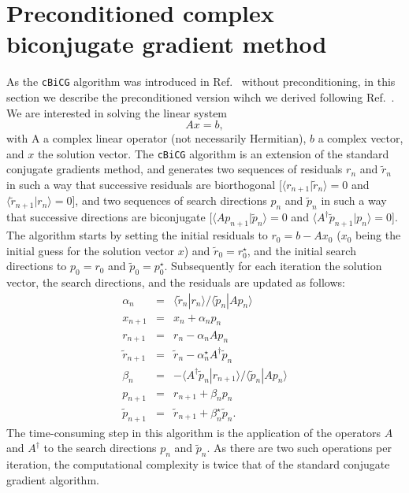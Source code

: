 \documentclass[twocolumn,prb,showpacs,superscriptaddress]{revtex4}
\def\>{\rangle}
\def\<{\langle}
\def\rt{\tilde{r}}
\def\pt{\tilde{p}}
\begin{document}
\section{Preconditioned complex biconjugate gradient method}\label{app.cbcg}

As the {\tt cBiCG} algorithm was introduced in Ref.\  
without preconditioning, in this section we describe the preconditioned version 
wihch we derived following Ref.~.
%
We are interested in solving the linear system
  \begin{equation}\label{eq.axeqb}
  Ax=b,
  \end{equation}
with A a complex linear operator (not necessarily Hermitian), $b$ a complex 
vector, and $x$ the solution vector.
The {\tt cBiCG} algorithm is an extension of the standard conjugate
gradients method, and generates two sequences of residuals $r_n$ and
$\rt_n$ in such a way that successive residuals 
are biorthogonal [$\<r_{n+1}|\rt_n\>=0$ and $\<\rt_{n+1}|r_n\>=0$], 
and two sequences of search directions 
$p_n$ and $\pt_n$ in such a way that successive directions
are biconjugate [$\< A p_{n+1}|\pt_n \> =0$ and 
$\< A^\dagger \pt_{n+1}|p_n \> =0$].\cite{jacobs}
The algorithm starts by setting the initial residuals to
$r_0 = b-Ax_0$ ($x_0$ being the initial guess for the solution vector $x$) 
and $\rt_0=r_0^\star$, and the initial search directions to $p_0=r_0$ 
and $\pt_0=p_0^\star$.
Subsequently for each iteration the solution
vector, the search directions, and the residuals are updated as follows:
  \begin{eqnarray}
  \alpha_n & = & \<\rt_n|r_n\>/\<\pt_n|Ap_n\> \label{eq.cg1}  \\ 
  x_{n+1} & = & x_n + \alpha_n p_n \label{eq.cg2} \\ 
  r_{n+1} & = & r_n - \alpha_n Ap_n \label{eq.cg3} \\ 
  \rt_{n+1} & = & \rt_n - \alpha_n^\star A^\dagger \pt_n \label{eq.cg4}\\ 
  \beta_n & = & - \<A^\dagger\pt_n|r_{n+1}\>/\<\pt_n|Ap_n\> \label{eq.cg5}\\ 
  p_{n+1} & = & r_{n+1} + \beta_n p_n \label{eq.cg6}\\ 
  \pt_{n+1} & = & \rt_{n+1} + \beta_n^\star \label{eq.cg7} \pt_n. 
  \end{eqnarray}
The time-consuming step in this algorithm is the application of the operators
$A$ and $A^\dagger$ to the search directions $p_n$ and $\pt_n$. 
As there are two such operations per iteration, the computational complexity 
is twice that of the standard conjugate gradient algorithm.
\end{document}
